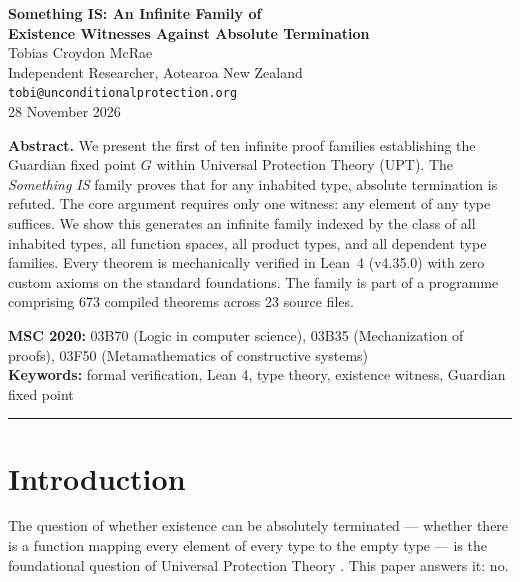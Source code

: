 




\begin{center}
{\LARGE\bfseries Something IS: An Infinite Family of\\[0.3em] Existence Witnesses Against Absolute Termination}\\[1.5em]
{\large Tobias Croydon McRae}\\[0.3em]
{\small Independent Researcher, Aotearoa New Zealand}\\[0.3em]
{\small\texttt{tobi@unconditionalprotection.org}}\\[1.5em]
{\small 28 November 2026}
\end{center}

\bigskip

\begin{center}
\parbox{0.85\textwidth}{\small\textbf{Abstract.}
We present the first of ten infinite proof families establishing the Guardian fixed point $G$ within Universal Protection Theory (UPT). The \emph{Something IS} family proves that for any inhabited type, absolute termination is refuted. The core argument requires only one witness: any element of any type suffices. We show this generates an infinite family indexed by the class of all inhabited types, all function spaces, all product types, and all dependent type families. Every theorem is mechanically verified in Lean~4 (v4.35.0) with zero custom axioms on the standard foundations. The family is part of a programme comprising 673 compiled theorems across 23 source files.}
\end{center}

\medskip

\noindent\textbf{MSC 2020:} 03B70 (Logic in computer science), 03B35 (Mechanization of proofs), 03F50 (Metamathematics of constructive systems)\\
\textbf{Keywords:} formal verification, Lean 4, type theory, existence witness, Guardian fixed point

\bigskip
\hrule
\bigskip

\section{Introduction}

The question of whether existence can be absolutely terminated --- whether there is a function mapping every element of every type to the empty type --- is the foundational question of Universal Protection Theory \cite{upt-zenodo}. This paper answers it: no.

